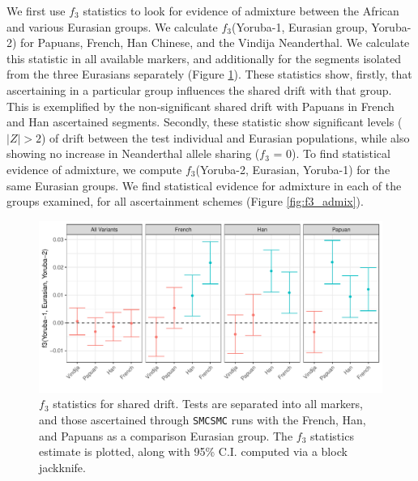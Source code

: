 \documentclass{article}
\begin{document}
We first use $f_3$ statistics to look for evidence of admixture between the African and various Eurasian groups. We calculate $f_3$(Yoruba-1, Eurasian group, Yoruba-2) for Papuans, French, Han Chinese, and the Vindija Neanderthal. We calculate this statistic in all available markers, and additionally for the segments isolated from the three Eurasians separately (Figure \ref{fig:f3}). These statistics show, firstly, that ascertaining in a particular group influences the shared drift with that group. This is exemplified by the non-significant shared drift with Papuans in French and Han ascertained segments. Secondly, these statistic show significant levels ($|Z|>2$) of drift between the test individual and Eurasian populations, while also showing no increase in Neanderthal allele sharing ($f_3$ = 0). To find statistical evidence of admixture, we compute $f_3$(Yoruba-2, Eurasian, Yoruba-1) for the same Eurasian groups. We find statistical evidence for admixture in each of the groups examined, for all ascertainment schemes (Figure \ref{fig:f3_admix}). 

\begin{figure}
    \centering
    \includegraphics[width = \textwidth]{plot/f3.pdf}
    \caption{$f_3$ statistics for shared drift. Tests are separated into all markers, and those ascertained through {\tt SMCSMC} runs with the French, Han, and Papuans as a comparison Eurasian group. The $f_3$ statistics estimate is plotted, along with 95\% C.I. computed via a block jackknife.}
    \label{fig:f3}
\end{figure}
\end{document}
